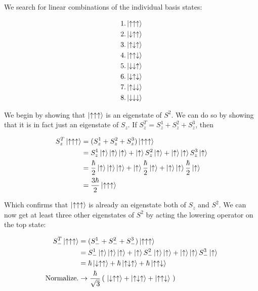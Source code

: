\documentclass[paper=a4, fontsize=11pt]{scrartcl} %
\numberwithin{equation}{section} %
\numberwithin{figure}{section} %
\numberwithin{table}{section} %
\begin{document}
\hspace{2mm}

We search for linear combinations of the individual basis states:

\begin{align}
1.\ket{\uparrow \uparrow \uparrow} \\
2.\ket{\downarrow \uparrow \uparrow} \\
3.\ket{\uparrow \downarrow \uparrow} \\
4.\ket{\uparrow \uparrow \downarrow} \\ 
5.\ket{\downarrow \downarrow \uparrow} \\
6.\ket{\downarrow \uparrow \downarrow} \\
7.\ket{\uparrow \downarrow \downarrow} \\
8.\ket{\downarrow \downarrow \downarrow}
\end{align}

We begin by showing that $\ket{\uparrow \uparrow \uparrow}$ is an eigenstate of $S^2$. We can do so by showing that it is in fact just an eigenstate of $S_z$. If $S^T_z = S^1_z + S^2_z + S^3_z$, then

\begin{align}
S^T_z\ket{\uparrow \uparrow \uparrow} &= (S^1_z + S^2_z + S^3_z)\ket{\uparrow \uparrow \uparrow} \\
&= S^1_z\ket{\uparrow}\ket{\uparrow}\ket{\uparrow} + \ket{\uparrow}S^2_z\ket{\uparrow} + \ket{\uparrow}\ket{\uparrow}S^3_z\ket{\uparrow} \\
&= \frac{\hbar}{2}\ket{\uparrow}\ket{\uparrow}\ket{\uparrow} + \ket{\uparrow}\frac{\hbar}{2}\ket{\uparrow} + \ket{\uparrow}\ket{\uparrow}\frac{\hbar}{2}\ket{\uparrow} \\
&= \frac{3\hbar}{2}\ket{\uparrow\uparrow\uparrow}
\end{align}

Which confirms that $\ket{\uparrow \uparrow \uparrow}$ is already an eigenstate both of $S_z$ and $S^2$. We can now get at least three other eigenstates of $S^2$ by acting the lowering operator on the top state:

\begin{align}
S^T_-\ket{\uparrow \uparrow \uparrow} &= (S^1_- + S^2_- + S^3_-) \ket{\uparrow \uparrow \uparrow} \\
&= S^1_-\ket{\uparrow}\ket{\uparrow}\ket{\uparrow} + \ket{\uparrow}S^2_-\ket{\uparrow}\ket{\uparrow} + \ket{\uparrow}\ket{\uparrow}S^3_-\ket{\uparrow} \\ 
&= \hbar \ket{\downarrow \uparrow \uparrow} + \hbar \ket{\uparrow \downarrow \uparrow} + \hbar \ket{\uparrow \uparrow \downarrow} \\
\text{Normalize.} &\rightarrow \frac{\hbar}{\sqrt{3}} \left( \ \ket{\downarrow \uparrow \uparrow} + \ket{\uparrow \downarrow \uparrow} + \ket{\uparrow \uparrow \downarrow} \ \right)
\end{align}
\end{document}
